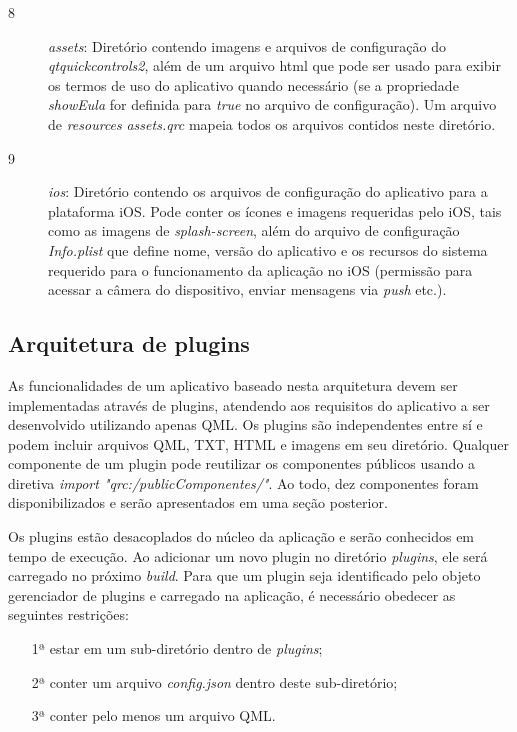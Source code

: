 \begin{description}
	\item[8] \textit{assets}: Diretório contendo imagens e arquivos de configuração do \textit{qtquickcontrols2}, além de um arquivo html que pode ser usado para exibir os termos de uso do aplicativo quando necessário (se a propriedade \textit{showEula} for definida para \textit{true} no arquivo de configuração). Um arquivo de \textit{resources} \textit{assets.qrc} mapeia todos os arquivos contidos neste diretório.

	\item[9] \textit{ios}: Diretório contendo os arquivos de configuração do aplicativo para a plataforma iOS. Pode conter os ícones e imagens requeridas pelo iOS, tais como as imagens de \textit{splash-screen}, além do arquivo de configuração \textit{Info.plist} que define nome, versão do aplicativo e os recursos do sistema requerido para o funcionamento da aplicação no iOS (permissão para acessar a câmera do dispositivo, enviar mensagens via \textit{push} etc.).
\end{description}


\subsection{Arquitetura de plugins}
As funcionalidades de um aplicativo baseado nesta arquitetura devem ser implementadas através de plugins, atendendo aos requisitos do aplicativo a ser desenvolvido utilizando apenas QML. Os plugins são independentes entre sí e podem incluir arquivos QML, TXT, HTML e imagens em seu diretório. Qualquer componente de um plugin pode reutilizar os componentes públicos usando a diretiva \textit{import "qrc:/publicComponentes/"}. Ao todo, dez componentes foram disponibilizados e serão apresentados em uma seção posterior.\par
Os plugins estão desacoplados do núcleo da aplicação e serão conhecidos em tempo de execução. Ao adicionar um novo plugin no diretório \textit{plugins}, ele será carregado no próximo \textit{build}. Para que um plugin seja identificado pelo objeto gerenciador de plugins e carregado na aplicação, é necessário obedecer as seguintes restrições:

\begin{enumerate}
	\item[1ª] estar em um sub-diretório dentro de \textit{plugins};
	\item[2ª] conter um arquivo \textit{config.json} dentro deste sub-diretório;
	\item[3ª] conter pelo menos um arquivo QML.
\end{enumerate}

